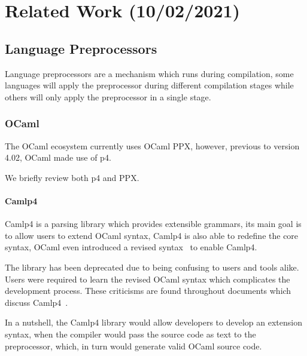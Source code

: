 \chapter{Related Work (10/02/2021)}\label{cha:rust-dsl}

\section{Language Preprocessors}\label{sec:lang-preprocessors}
Language preprocessors are a mechanism which runs during compilation,
some languages will apply the preprocessor during different compilation stages while others will only apply the preprocessor in a single stage.


\subsection{OCaml}\label{sec:lang-preprocessors:ocaml}

The OCaml ecosystem currently uses OCaml \gls{PPX},
however, previous to version 4.02, OCaml made use of \gls{p4}.

We briefly review both \gls{p4} and \gls{PPX}.

\subsubsection*{Camlp4}\label{sec:lang-preprocessors:ocaml:p4}

Camlp4 is a parsing library which provides extensible grammars,
its main goal is to allow users to extend OCaml syntax,
Camlp4 is also able to redefine the core syntax,
OCaml even introduced a revised syntax~\autocite{Rauglaudre2003} to enable Camlp4.

The library has been deprecated due to being confusing to users and tools alike.
Users were required to learn the revised OCaml syntax which complicates the development process.
These criticisms are found throughout documents which discuss Camlp4~\autocite{Whitequark2014}.

In a nutshell, the Camlp4 library would allow developers to develop an extension syntax,
when the compiler would pass the source code as text to the preprocessor,
which, in turn would generate valid OCaml source code.

